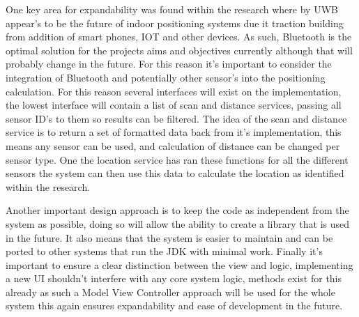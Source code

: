 One key area for expandability was found within the research where by UWB appear's to be the future of indoor positioning systems due it traction building from addition of smart phones, IOT and other devices. As such, Bluetooth is the optimal solution for the projects aims and objectives currently although that will probably change in the future. For this reason it's important to consider the integration of Bluetooth and potentially other sensor's into the positioning calculation. For this reason several interfaces will exist on the implementation, the lowest interface will contain a list of scan and distance services, passing all sensor ID's to them so results can be filtered. The idea of the scan and distance service is to return a set of formatted data back from it's implementation, this means any sensor can be used, and calculation of distance can be changed per sensor type. One the location service has ran these functions for all the different sensors the system can then use this data to calculate the location as identified within the research.

Another important design approach is to keep the code as independent from the system as possible, doing so will allow the ability to create a library that is used in the future. It also means that the system is easier to maintain and can be ported to other systems that run the JDK with minimal work. Finally it's important to ensure a clear distinction between the view and logic, implementing a new UI shouldn't interfere with any core system logic, methods exist for this already as such a Model View Controller approach will be used for the whole system this again ensures expandability and ease of development in the future.